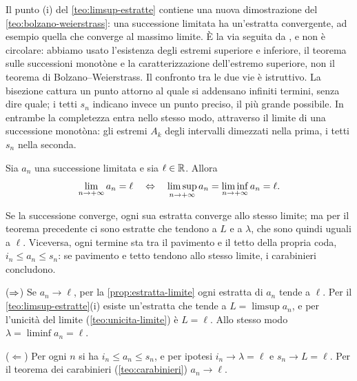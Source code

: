 \begin{osservazione}\label{oss:bw-limsup}
Il punto (i) del \cref{teo:limsup-estratte} contiene una nuova dimostrazione del
\cref{teo:bolzano-weierstrass}: una successione limitata ha un'estratta convergente, ad
esempio quella che converge al massimo limite. È la via seguita da \cite{giusti}, e non è
circolare: abbiamo usato l'esistenza degli estremi superiore e inferiore, il teorema
sulle successioni monotòne e la caratterizzazione dell'estremo superiore, non il teorema
di Bolzano--Weierstrass. Il confronto tra le due vie è istruttivo. La bisezione cattura
un punto attorno al quale si addensano infiniti termini, senza dire quale; i tetti
$s_{n}$ indicano invece un punto preciso, il più grande possibile. In entrambe la
completezza entra nello stesso modo, attraverso il limite di una successione monotòna:
gli estremi $A_{k}$ degli intervalli dimezzati nella prima, i tetti $s_{n}$ nella
seconda.
\end{osservazione}

\begin{teorema}\label{teo:limsup-limite}
Sia $a_{n}$ una successione limitata e sia $\ell\in\mathbb{R}$. Allora
\begin{equation}\label{eq:limsup-limite}
  \lim_{n\to+\infty}a_{n}=\ell \quad\Leftrightarrow\quad
  \limsup_{n\to+\infty}a_{n}=\liminf_{n\to+\infty}a_{n}=\ell .
\end{equation}
\end{teorema}

\begin{schema}
\end{schema}

\begin{strategia}
Se la successione converge, ogni sua estratta converge allo stesso limite; ma per il
teorema precedente ci sono estratte che tendono a $L$ e a $\lambda$, che sono quindi
uguali a $\ell$. Viceversa, ogni termine sta tra il pavimento e il tetto della propria
coda, $i_{n}\le a_{n}\le s_{n}$: se pavimento e tetto tendono allo stesso limite, i
carabinieri concludono.
\end{strategia}

\begin{dimostrazione}
($\Rightarrow$) Se $a_{n}\to\ell$, per la \cref{prop:estratta-limite} ogni estratta di
$a_{n}$ tende a $\ell$. Per il \cref{teo:limsup-estratte}(i) esiste un'estratta che
tende a $L=\limsup a_{n}$, e per l'unicità del limite (\cref{teo:unicita-limite}) è
$L=\ell$. Allo stesso modo $\lambda=\liminf a_{n}=\ell$.

($\Leftarrow$) Per ogni $n$ si ha $i_{n}\le a_{n}\le s_{n}$, e per ipotesi
$i_{n}\to\lambda=\ell$ e $s_{n}\to L=\ell$. Per il teorema dei carabinieri
(\cref{teo:carabinieri}) $a_{n}\to\ell$.
\end{dimostrazione}


